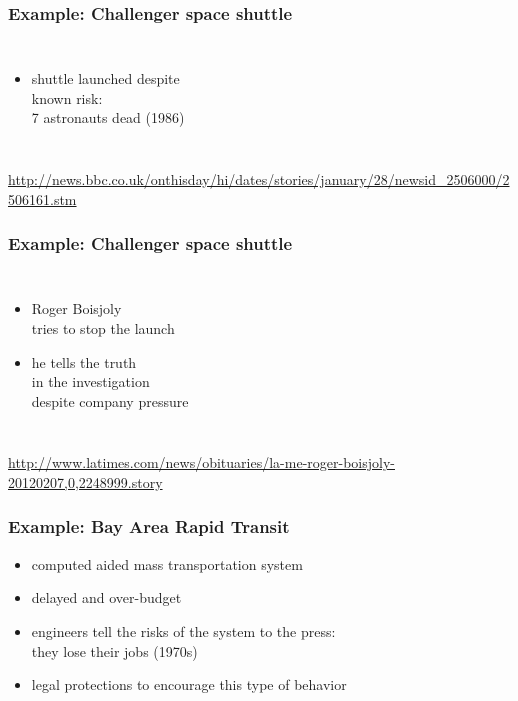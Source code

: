 \documentclass[dvipsnames]{beamer}
\theoremstyle{plain}
\begin{document}
\begin{frame}
  \frametitle{Example: Challenger space shuttle}

  \begin{columns}

    \begin{itemize}
      \item shuttle launched despite\\
        known risk:\\
        7 astronauts dead (1986)
    \end{itemize}
  \end{columns}

  \medskip
  \tiny{\url{http://news.bbc.co.uk/onthisday/hi/dates/stories/january/28/newsid_2506000/2506161.stm}}\\
\end{frame}

\begin{frame}
  \frametitle{Example: Challenger space shuttle}

  \begin{columns}

    \begin{itemize}
      \item Roger Boisjoly\\
        tries to stop the launch
      \item he tells the truth\\
        in the investigation\\
        despite company pressure
    \end{itemize}
  \end{columns}

  \medskip
  \tiny{\url{http://www.latimes.com/news/obituaries/la-me-roger-boisjoly-20120207,0,2248999.story}}\\
\end{frame}

\begin{frame}
  \frametitle{Example: Bay Area Rapid Transit}

  \begin{itemize}
    \item computed aided mass transportation system
    \item delayed and over-budget
    \item engineers tell the risks of the system to the press:\\
      they lose their jobs (1970s)

    \medskip
    \item legal protections to encourage this type of behavior
  \end{itemize}
\end{frame}
\end{document}
